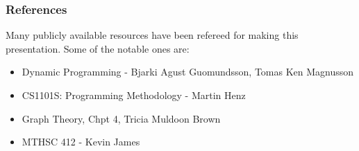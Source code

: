 \begin{frame}\frametitle{References}
Many publicly available resources have been refereed for making this presentation. Some of the notable ones are:
\small
\begin{itemize}
\item Dynamic Programming - Bjarki Agust Guomundsson, Tomas Ken Magnusson
\item CS1101S: Programming Methodology - Martin Henz
\item Graph Theory, Chpt 4, Tricia Muldoon Brown
\item MTHSC 412 - Kevin James
\end{itemize}
\end{frame}

